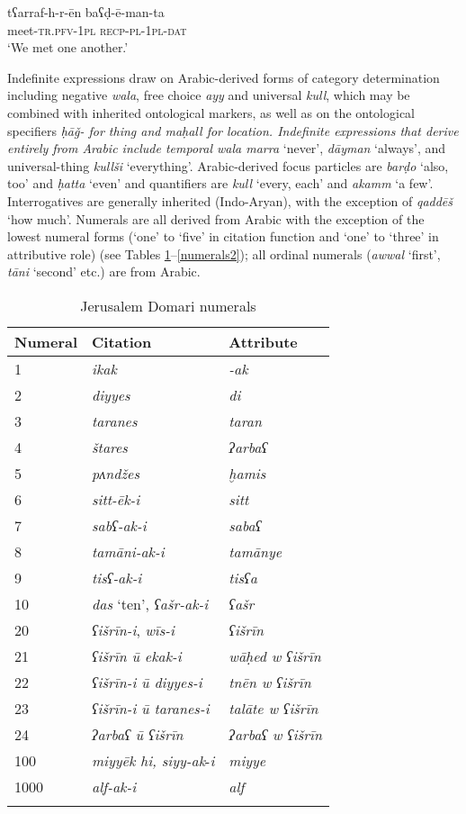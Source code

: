 \documentclass[output=paper]{langsci/langscibook}
\begin{document}
\ea \gll tʕarraf-h-r-ēn baʕḍ-ē-man-ta\\
     meet-\textsc{tr.pfv-1pl} \textsc{recp-pl-1pl-dat}\\
\glt ‘We met one another.’
\z

Indefinite expressions draw on Arabic-derived forms of category determination including negative \textit{wala}, free choice \textit{ayy} and universal \textit{kull}, which may be combined with inherited ontological markers, as well as on the ontological specifiers \textit{ḥāǧ- \textup{for thing and} maḥall \textup{for location. Indefinite expressions that derive entirely from Arabic include temporal} wala marra} {{‘never’,} \textit{dāyman} \textup{‘always’, and universal-thing} \textit{kullši} \textup{‘everything’. Arabic-derived} }focus particles are \textit{barḍo} ‘also, too’ and \textit{ḥatta} ‘even’ and quantifiers are \textit{kull} ‘every, each’ and \textit{akamm} ‘a few’. Interrogatives are generally inherited (Indo-Aryan), with the exception of \textit{qaddēš} ‘how much’. Numerals are all derived from Arabic with the exception of the lowest numeral forms (`one' to `five' in citation function and `one' to `three' in attributive role) (see Tables \ref{numerals1}–\ref{numerals2}); all ordinal numerals (\textit{awwal} ‘first’, \textit{tāni} `second' etc.) are from Arabic.
\\

\begin{table}[]
\begin{tabularx}{\textwidth}{XXX}
\lsptoprule Numeral & Citation & Attribute\\
\midrule
1 & \textit{ikak} & \textit{-ak}\\
2 & \textit{diyyes} & \textit{di}\\
3 & \textit{taranes}  & \textit{taran}\\
4 & \textit{štares}  & \textit{ʔarbaʕ}\\
5 & \textit{pʌndžes}  & \textit{ḫamis}\\
6 & \textit{sitt-ēk-i} & \textit{sitt}\\
7 & \textit{sabʕ-ak-i} & \textit{sabaʕ}\\
8 & \textit{tamāni-ak-i} & \textit{tamānye}\\
9 & \textit{tisʕ-ak-i} & \textit{tisʕa}\\
10 & \textit{das} ‘ten’, \textit{ʕašr-ak-i} & \textit{ʕašr}\\
20 & \textit{ʕišrīn-i}, \textit{wīs-i} & \textit{ʕišrīn}\\
21 & \textit{ʕišrīn ū ekak-i} & \textit{wāḥed w ʕišrīn}\\
22 & \textit{ʕišrīn-i ū diyyes-i} & \textit{tnēn w ʕišrīn}\\
23 & \textit{ʕišrīn-i ū taranes-i} & \textit{talāte w ʕišrīn}\\
24 & \textit{ʔarbaʕ ū ʕišrīn} & \textit{ʔarbaʕ w ʕišrīn}\\
100 & \textit{miyyēk hi, siyy-ak}-\textit{i} & \textit{miyye}\\
1000 & \textit{alf-ak-i} & \textit{alf}\\
\lspbottomrule
\end{tabularx}
\caption{Jerusalem Domari numerals}
\label{numerals1}
\end{table}
\end{document}
